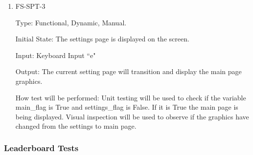 \documentclass[12pt, titlepage]{article}
\begin{document}
\begin{enumerate}
\item{FS-SPT-3\\}

Type: Functional, Dynamic, Manual.
					
Initial State: The settings page is displayed on the screen. 
					
Input: Keyboard Input ``e"
					
Output: The current setting page will transition and display the main page graphics. 
					
How test will be performed: Unit testing will be used to check if the variable main\_flag is True and settings\_flag is False. If it is True the main page is being displayed. Visual inspection will be used to observe if the graphics have changed from the settings to main page. 

\end{enumerate}

\subsubsection{Leaderboard Tests}
\end{document}
